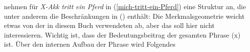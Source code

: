 \citet[]{RS2009a} nehmen für  \emph{X-Akk tritt ein Pferd} in (\ref{mich-tritt-ein-Pferd})
eine Struktur an, die unter anderem die Beschränkungen in () enthält:
\eanoraggedright
{}
\z
Die Merkmalsgeometrie weicht etwas von der in diesem Buch verwendeten ab, aber das
soll hier nicht interessieren. Wichtig ist, dass der Bedeutungsbeitrag der gesamten
Phrase (x) ist. Über den internen Aufbau der Phrase wird Folgendes
